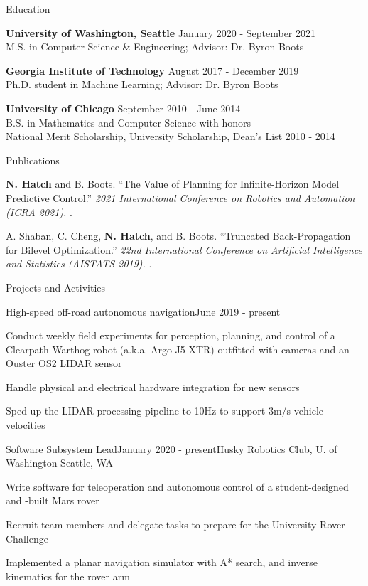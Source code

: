 \documentclass{resume} %
\begin{document}
\begin{rSection}{Education}

{\bf University of Washington, Seattle} \hfill {January 2020 - September 2021} \\
M.S. in Computer Science \& Engineering; Advisor: Dr. Byron Boots

{\bf Georgia Institute of Technology} \hfill {August 2017 - December 2019} \\
Ph.D. student in Machine Learning; Advisor: Dr. Byron Boots

{\bf University of Chicago} \hfill {September 2010 - June 2014} \\
B.S. in Mathematics and Computer Science with honors \\
National Merit Scholarship, University Scholarship, Dean's List 2010 - 2014

\end{rSection}

\begin{rSection}{Publications}

{\bf N. Hatch} and B. Boots. ``The Value of Planning for Infinite-Horizon Model Predictive Control.''
{\em 2021 International Conference on Robotics and Automation (ICRA 2021).}
.

A. Shaban, C. Cheng, {\bf N. Hatch}, and B. Boots. ``Truncated Back-Propagation for Bilevel Optimization.''
{\em 22nd International Conference on Artificial Intelligence and Statistics (AISTATS 2019).}
.

\end{rSection}

\begin{rSection}{Projects and Activities}

\begin{rProject}{High-speed off-road autonomous navigation}{June 2019 - present}
\item Conduct weekly field experiments for perception, planning, and control of a Clearpath Warthog robot (a.k.a. Argo J5 XTR) outfitted with cameras and an Ouster OS2 LIDAR sensor
\item Handle physical and electrical hardware integration for new sensors
\item Sped up the LIDAR processing pipeline to 10Hz to support 3m/s vehicle velocities
\end{rProject}

\begin{rSubsection}{Software Subsystem Lead}{January 2020 - present}{Husky Robotics Club, U. of Washington}{ Seattle, WA}
\item Write software for teleoperation and autonomous control of a student-designed and -built Mars rover
\item Recruit team members and delegate tasks to prepare for the University Rover Challenge
\item Implemented a planar navigation simulator with A* search, and inverse kinematics for the rover arm
\end{rSubsection}

\end{rSection}
\end{document}
